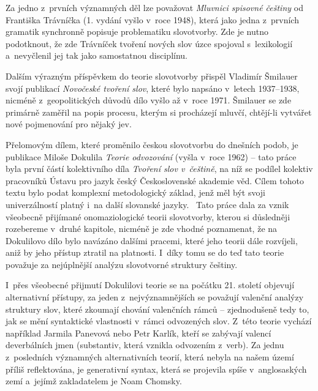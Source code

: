 Za jedno z~prvních významných děl lze považovat \emph{Mluvnici spisovné
češtiny} od Františka Trávníčka (1. vydání vyšlo v~roce 1948), která
jako jedna z~prvních gramatik synchronně popisuje problematiku
slovotvorby. Zde je nutno podotknout, že zde Trávníček tvoření nových
slov úzce spojoval s~lexikologií a~nevyčlenil jej tak jako samostatnou
disciplínu.~\parencite[263]{rousinova07}

Dalším výrazným příspěvkem do teorie slovotvorby přispěl Vladimír
Šmilauer svojí publikací \emph{Novočeské tvoření slov}, které bylo
napsáno v~letech 1937--1938, nicméně z~geopolitických důvodů dílo vyšlo
až v~roce 1971. Šmilauer se zde primárně zaměřil na popis procesu,
kterým si procházejí mluvčí, chtějí-li vytvářet nové pojmenování pro
nějaký jev.~\parencite[265]{rousinova07}

Přelomovým dílem, které proměnilo českou slovotvorbu do dnešních podob,
je publikace Miloše Dokulila \emph{Teorie odvozování} (vyšla v~roce
1962) -- tato práce byla první částí kolektivního díla \emph{Tvoření
slov v~češtině}, na níž se podílel kolektiv pracovníků Ústavu pro jazyk
český Československé akademie věd. Cílem tohoto textu bylo podat
komplexní metodologický základ, jenž měl být svoji univerzálností platný
i~na další slovanské jazyky.~\parencite[267]{rousinova07} Tato práce
dala za vznik všeobecně přijímané onomaziologické teorii slovotvorby,
kterou si důsledněji rozebereme v~druhé kapitole, nicméně je zde vhodné
poznamenat, že na Dokulilovo dílo bylo navázáno dalšími pracemi, které
jeho teorii dále rozvíjeli, aniž by jeho přístup ztratil na platnosti.
\parencite[272]{rousinova07} I~díky tomu se do teď tato teorie považuje
za nejúplnější analýzu slovotvorné struktury češtiny.
\parencite[273]{zikova07}

I~přes všeobecné přijmutí Dokulilovi teorie se na počátku 21. století
objevují alternativní přístupy, za jeden z~nejvýznamnějších se považují
valenční analýzy struktury slov, které zkoumají chování valenčních rámců
-- zjednodušeně tedy to, jak se mění syntaktické vlastnosti v~rámci
odvozených slov. Z~této teorie vychází například Jarmila Panevová nebo
Petr Karlík, kteří se zabývají valencí deverbálních jmen (substantiv,
která vznikla odvozením z~verb). Za jednu z~posledních významných
alternativních teorií, která nebyla na našem území příliš reflektována,
je generativní syntax, která se projevila spíše v~anglosaských zemí
a~jejímž zakladatelem je Noam Chomsky.~\parencite[274--275]{zikova07}
